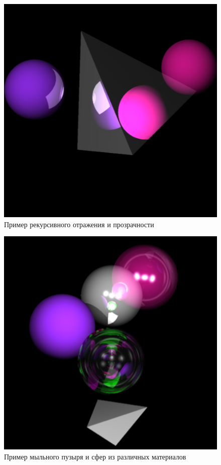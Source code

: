 \begin{figure}[h]
	\begin{center}
		\includegraphics[width=0.9\linewidth]{img/func_2.png}
	\end{center}
	\captionsetup{justification=centering}
	\caption{Пример рекурсивного отражения и прозрачности}
	\label{img:func_2}
\end{figure}

\begin{figure}[h]
	\begin{center}
		\includegraphics[width=0.9\linewidth]{img/func_3.png}
	\end{center}
	\captionsetup{justification=centering}
	\caption{Пример мыльного пузыря и сфер из различных материалов}
	\label{img:func_3}
\end{figure}

